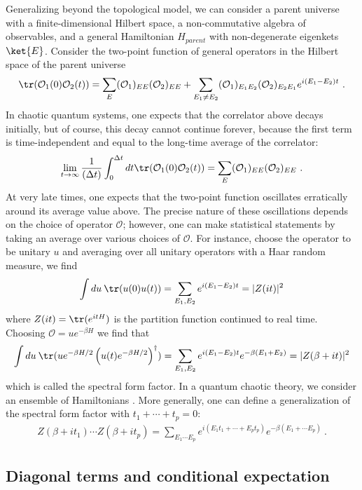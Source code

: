\documentclass[a4paper,11pt]{article}
\theoremstyle{definition}
\numberwithin{equation}{section}
\newcommand{\mO}{\mathcal{O}}
\newcommand{\lb}{\left(}
\newcommand{\rb}{\right)}
\begin{document}
Generalizing beyond the topological model, we can consider a parent universe with a finite-dimensional Hilbert space, a non-commutative algebra of observables, and a general Hamiltonian $H_{parent}$ with non-degenerate eigenkets $\ket{E}$. Consider the two-point function of general operators in the Hilbert space of the parent universe
\begin{eqnarray}
    \tr(\mO_1(0)\mO_2(t))=\sum_E (\mO_1)_{EE}(\mO_2)_{EE}+\sum_{E_1\neq E_2}(\mO_1)_{E_1E_2}(\mO_2)_{E_2E_1}e^{i(E_1-E_2)t}\ .
\end{eqnarray}
In chaotic quantum systems, one expects that the correlator above decays initially, but of course, this decay cannot continue forever, because the first term is time-independent and equal to the long-time average of the correlator:
\begin{eqnarray}
    \lim_{t\to \infty}\frac{1}{(\Delta t)}\int_0^{\Delta t}dt \tr(\mO_1(0)\mO_2(t))=\sum_E (\mO_1)_{EE}(\mO_2)_{EE}\ .
\end{eqnarray}
At very late times, one expects that the two-point function oscillates erratically around its average value above. The precise nature of these oscillations depends on the choice of operator $\mO$; however, one can make statistical statements by taking an average over various choices of $\mO$. For instance, choose the operator to be unitary $u$ and averaging over all unitary operators with a Haar random measure, we find
\begin{eqnarray}
    \int du\: \tr(u(0) u(t))=\sum_{E_1,E_2}e^{i(E_1-E_2)t}=|Z(it)|^2
\end{eqnarray}
where $Z(it)=\tr(e^{i t H})$ is the partition function continued to real time. Choosing $\mO=u e^{-\beta H}$ we find that
\begin{eqnarray}\label{SFF}
    \int du \: \tr(u e^{-\beta H/2} \lb u(t) e^{-\beta H/2}\rb^\dagger)=\sum_{E_1,E_2}e^{i(E_1-E_2)t}e^{-\beta(E_1+E_2)}=|Z(\beta+it)|^2
\end{eqnarray}
which is called the spectral form factor. In a quantum chaotic theory, we consider an ensemble of Hamiltonians \cite{mehta2004random}. More generally, one can define a generalization of the spectral form factor with $t_1+\cdots+t_p=0$:
\begin{eqnarray}\label{highptSFF}
    Z(\beta+it_1)\cdots Z(\beta+it_p)=\sum_{E_1\cdots E_p}e^{i(E_1 t_1+\cdots +E_pt_p)}e^{-\beta(E_1+\cdots E_p)}\ .
\end{eqnarray}

\subsection{Diagonal terms and conditional expectation}
\end{document}
